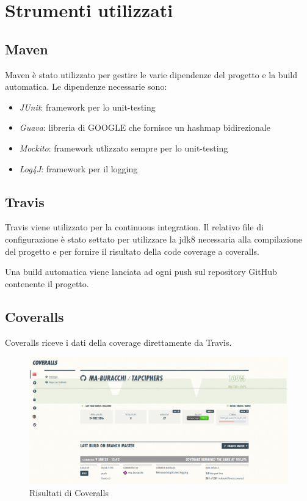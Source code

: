 \chapter{Strumenti utilizzati}

	\section{Maven}
		Maven è stato utilizzato per gestire le varie dipendenze del progetto e la build automatica.
		Le dipendenze necessarie sono: 
		\begin{itemize}
			\item \emph{JUnit}: framework per lo unit-testing
			\item \emph{Guava}: libreria di GOOGLE che fornisce un hashmap bidirezionale
			\item \emph{Mockito}: framework utlizzato sempre per lo unit-testing
			\item \emph{Log4J}: framework per il logging 
		\end{itemize}
		
	\section{Travis}
		Travis viene utilizzato per la continuous integration. Il relativo file di configurazione è stato settato per utilizzare la jdk8 necessaria alla compilazione del progetto e per fornire il risultato della code coverage a coveralls.
		
		Una build automatica viene lanciata ad ogni push sul repository GitHub contenente il progetto.
		
	\section{Coveralls}
		Coveralls riceve i dati della coverage direttamente da Travis.
		
		\begin{figure}[h]
			\centering
			\includegraphics[scale=0.2]{img/coverall}
			\caption{Risultati di Coveralls}
			\label{fig:coveralls}
		\end{figure}
				
